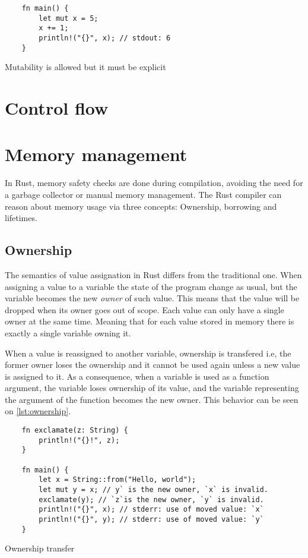 \begin{listing}
	\begin{verbatim}
    fn main() {
        let mut x = 5;
        x += 1;
        println!("{}", x); // stdout: 6 
    }
	\end{verbatim}
  \caption{Mutability is allowed but it must be explicit}
  \label{lst:mutable}
\end{listing}

\section{Control flow}

\section{Memory management}
In Rust, memory safety checks are done during compilation, avoiding the need for a garbage collector or manual memory management. The Rust compiler can reason about memory usage via three concepts: Ownership, borrowing and lifetimes.

\subsection{Ownership}
The semantics of value assignation in Rust differs from the traditional one. When assigning a value to a variable the state of the program change as usual, but the variable becomes the new \textit{owner} of such value. This means that the value will be dropped when its owner goes out of scope. Each value can only have a single owner at the same time. Meaning that for each value stored in memory there is exactly a single variable owning it. 

When a value is reassigned to another variable, ownership is transfered i.e, the former owner loses the ownership and it cannot be used again unless a new value is assigned to it. As a consequence, when a variable is used as a function argument, the variable loses ownership of its value, and the variable representing the argument of the function becomes the new owner. This behavior can be seen on \ref{lst:ownership}.

\begin{listing}
	\begin{verbatim}
    fn exclamate(z: String) {
        println!("{}!", z);
    }

    fn main() {
        let x = String::from("Hello, world");
        let mut y = x; // y` is the new owner, `x` is invalid.
        exclamate(y); // `z`is the new owner, `y` is invalid.
        println!("{}", x); // stderr: use of moved value: `x`
        println!("{}", y); // stderr: use of moved value: `y`
    }
	\end{verbatim}
  \caption{Ownership transfer}
  \label{lst:ownership}
\end{listing}

